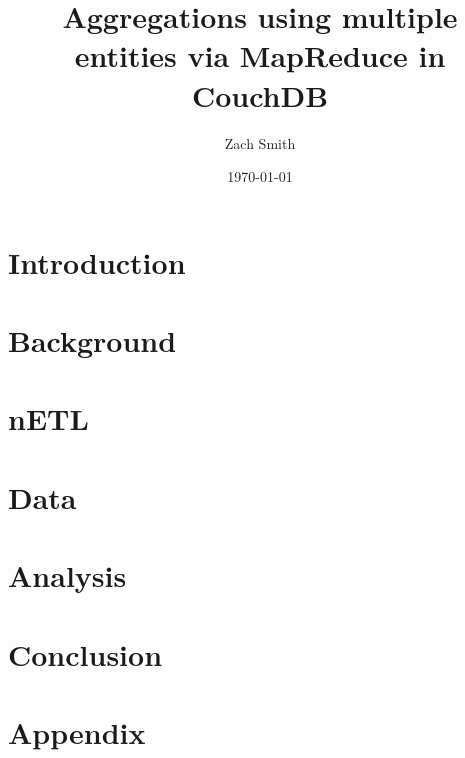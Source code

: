 \documentclass[
    parskip=full,
    a4paper
]{report}
\title{Aggregations using multiple entities via MapReduce in CouchDB}
\author{Zach Smith}
\date{\today}
\begin{document}
\maketitle
\thispagestyle{empty}

\begin{abstract}
    
\end{abstract}
\newpage

\tableofcontents
\newpage

\chapter{Introduction}


\chapter{Background}





\chapter{nETL}






\chapter{Data}







\chapter{Analysis}


\chapter{Conclusion}




\newpage




\appendix
\chapter{Appendix}





\listoffigures
\listoftables
\newpage

\end{document}
